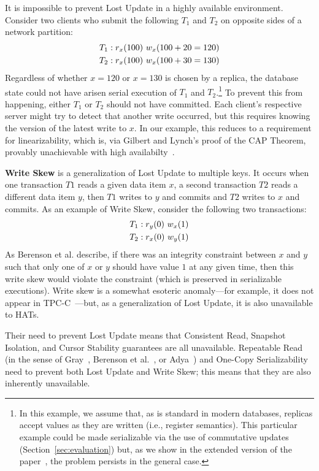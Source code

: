 It is impossible to prevent Lost Update in a highly available
environment. Consider two clients who submit the following $T_1$ and
$T_2$ on opposite sides of a network partition:
\begin{align*}
\small
T_1 &: r_x(100)~w_x(100+20=120)
\\T_2 &: r_x(100)~w_x(100+30=130)
\end{align*}
Regardless of whether $x=120$ or $x=130$ is chosen by a replica, the
database state could not have arisen serial execution of $T_1$ and
$T_2$.\footnote{In this example, we assume that, as is standard in
  modern databases, replicas accept values as they are written (i.e.,
  register semantics). This particular example could be made
  serializable via the use of commutative updates
  (Section~\ref{sec:evaluation}) but, as we show in the extended version of
  the paper~\cite{hat-tr}, the problem persists in the general case.}
To prevent this from happening, either $T_1$ or $T_2$ should not have
committed. Each client's respective server might try to detect that
another write occurred, but this requires knowing the version of the
latest write to $x$. In our example, this reduces to a requirement for
linearizability, which is, via Gilbert and Lynch's proof of the CAP
Theorem, provably unachievable with high
availabilty~\cite{gilbert-cap}.

\textbf{Write Skew} is a generalization of Lost Update to multiple
keys. It occurs when one transaction $T1$ reads a given data item $x$,
a second transaction $T2$ reads a different data item $y$, then $T1$
writes to $y$ and commits and $T2$ writes to $x$ and commits. As an
example of Write Skew, consider the following two transactions:
\begin{align*}
\small
T_1 &: r_y(0)~w_x(1)
\\T_2 &: r_x(0)~w_y(1)
\end{align*}
As Berenson et al. describe, if there was an integrity constraint
between $x$ and $y$ such that only one of $x$ or $y$ should have value
$1$ at any given time, then this write skew would violate the constraint (which is preserved in serializable executions). Write skew is a somewhat
esoteric anomaly---for example, it does not appear in
TPC-C~\cite{snapshot-serializable}---but, as a generalization of Lost
Update, it is also unavailable to HATs.

Their need to prevent Lost Update means that Consistent Read, Snapshot
Isolation, and Cursor Stability guarantees are all unavailable.
Repeatable Read (in the sense of Gray~\cite{gray-isolation}, Berenson
et al.~\cite{ansicritique}, or Adya~\cite{adya}) and One-Copy
Serializability need to prevent both Lost Update and Write Skew; this
means that they are also inherently unavailable.

